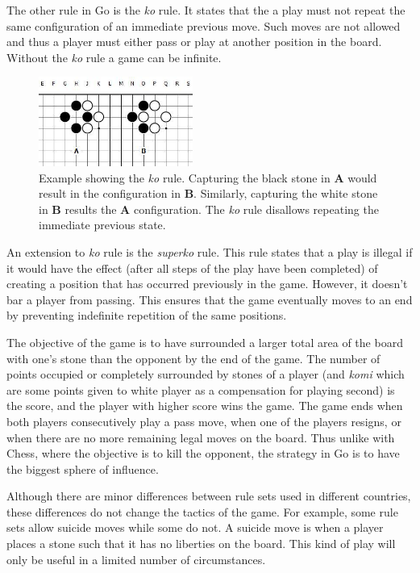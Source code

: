 \documentclass[nocopyrightspace, 10pt]{sigplanconf}
\begin{document}
The other rule in Go is the \textit{ko} rule. It states that the a play must not repeat the same configuration of an immediate previous move. Such moves are not allowed and thus a player must either pass or play at another position in the board. Without the \textit{ko} rule a game can be infinite.

\begin{figure}
\begin{center}
\includegraphics[width=0.45\textwidth]{ko.jpg}
\end{center}
\caption{Example showing the \textit{ko} rule. Capturing the black stone in \textbf{A} would result in the configuration in \textbf{B}. Similarly, capturing the white stone in \textbf{B} results the \textbf{A} configuration. The \textit{ko} rule disallows repeating the immediate previous state.}
\label{ko}
\end{figure}


An extension to \textit{ko} rule is the \textit{superko} rule. This rule states that a play is illegal if it would have the effect (after all steps of the play have been completed) of creating a position that has occurred previously in the game. However, it doesn't bar a player from passing. This ensures that the game eventually moves to an end by preventing indefinite repetition of the same positions.


The objective of the game is to have surrounded a larger total area of the board with one's stone than the opponent by the end of the game. The number of points occupied or completely surrounded by stones of a player (and \textit{komi} which are some points given to white player as a compensation for playing second) is the score, and the player with higher score wins the game. The game ends when both players consecutively play a pass move, when one of the players resigns, or when there are no more remaining legal moves on the board. Thus unlike with Chess, where the objective is to kill the opponent, the strategy in Go is to have the biggest sphere of influence.

Although there are minor differences between rule sets used in different countries, these differences do not change the tactics of the game. For example, some rule sets allow suicide moves while some do not. A suicide move is when a player places a stone such that it has no liberties on the board. This kind of play will only be useful in a limited number of circumstances.
\end{document}
